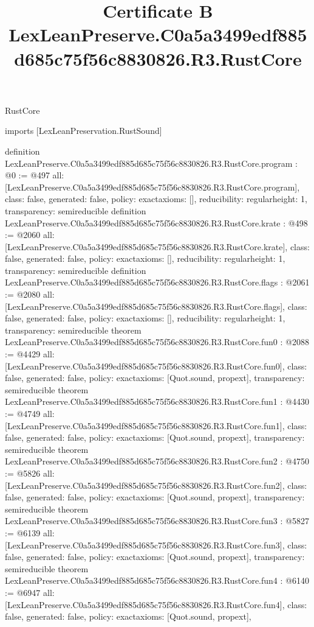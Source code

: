 \begin{lexlean}{RustCore}
\title{Certificate B LexLeanPreserve.C0a5a3499edf885d685c75f56c8830826.R3.RustCore}
\begin{coremodule}
imports [LexLeanPreservation.RustSound]

definition LexLeanPreserve.C0a5a3499edf885d685c75f56c8830826.R3.RustCore.program : @0 := @497 {
  all: [LexLeanPreserve.C0a5a3499edf885d685c75f56c8830826.R3.RustCore.program],
  class: false,
  generated: false,
  policy: exact{axioms: []},
  reducibility: regular{height: 1},
  transparency: semireducible
}
definition LexLeanPreserve.C0a5a3499edf885d685c75f56c8830826.R3.RustCore.krate : @498 := @2060 {
  all: [LexLeanPreserve.C0a5a3499edf885d685c75f56c8830826.R3.RustCore.krate],
  class: false,
  generated: false,
  policy: exact{axioms: []},
  reducibility: regular{height: 1},
  transparency: semireducible
}
definition LexLeanPreserve.C0a5a3499edf885d685c75f56c8830826.R3.RustCore.flags : @2061 := @2080 {
  all: [LexLeanPreserve.C0a5a3499edf885d685c75f56c8830826.R3.RustCore.flags],
  class: false,
  generated: false,
  policy: exact{axioms: []},
  reducibility: regular{height: 1},
  transparency: semireducible
}
theorem LexLeanPreserve.C0a5a3499edf885d685c75f56c8830826.R3.RustCore.fun0 : @2088 := @4429 {
  all: [LexLeanPreserve.C0a5a3499edf885d685c75f56c8830826.R3.RustCore.fun0],
  class: false,
  generated: false,
  policy: exact{axioms: [Quot.sound, propext]},
  transparency: semireducible
}
theorem LexLeanPreserve.C0a5a3499edf885d685c75f56c8830826.R3.RustCore.fun1 : @4430 := @4749 {
  all: [LexLeanPreserve.C0a5a3499edf885d685c75f56c8830826.R3.RustCore.fun1],
  class: false,
  generated: false,
  policy: exact{axioms: [Quot.sound, propext]},
  transparency: semireducible
}
theorem LexLeanPreserve.C0a5a3499edf885d685c75f56c8830826.R3.RustCore.fun2 : @4750 := @5826 {
  all: [LexLeanPreserve.C0a5a3499edf885d685c75f56c8830826.R3.RustCore.fun2],
  class: false,
  generated: false,
  policy: exact{axioms: [Quot.sound, propext]},
  transparency: semireducible
}
theorem LexLeanPreserve.C0a5a3499edf885d685c75f56c8830826.R3.RustCore.fun3 : @5827 := @6139 {
  all: [LexLeanPreserve.C0a5a3499edf885d685c75f56c8830826.R3.RustCore.fun3],
  class: false,
  generated: false,
  policy: exact{axioms: [Quot.sound, propext]},
  transparency: semireducible
}
theorem LexLeanPreserve.C0a5a3499edf885d685c75f56c8830826.R3.RustCore.fun4 : @6140 := @6947 {
  all: [LexLeanPreserve.C0a5a3499edf885d685c75f56c8830826.R3.RustCore.fun4],
  class: false,
  generated: false,
  policy: exact{axioms: [Quot.sound, propext]},
}
\end{coremodule}
\end{lexlean}
